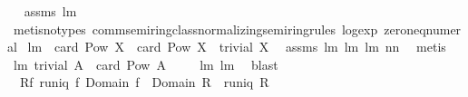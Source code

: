 \begin{isabellebody}
\isadelimproof
\ %
\endisadelimproof
%
\isatagproof
{}\isamarkupfalse%
\ assms\ lm{}{}{}\ \isanewline
{}\isamarkupfalse%
\ {\isacharparenleft}metis{\isacharparenleft}no{\isacharunderscore}types{\isacharparenright}\ comm{\isacharunderscore}semiring{\isacharunderscore}{}{\isacharunderscore}class{\isachardot}normalizing{\isacharunderscore}semiring{\isacharunderscore}rules{\isacharparenleft}{}{}{\isacharparenright}\ log{\isacharunderscore}exp\ zero{\isacharunderscore}neq{\isacharunderscore}numeral{\isacharparenright}%
\endisatagproof
{\isafoldproof}%
%
\isadelimproof
%
\endisadelimproof
\isanewline
\isanewline
{}\isamarkupfalse%
\ lm{}{}{}{\isacharcolon}\ \ {\isachardoublequoteopen}card\ {\isacharparenleft}Pow\ X{\isacharparenright}{\isacharequal}{}\ {\isasymor}\ card\ {\isacharparenleft}Pow\ X{\isacharparenright}{\isacharequal}{}{\isachardoublequoteclose}\ \ {\isachardoublequoteopen}trivial\ X{\isachardoublequoteclose}\ \isanewline
%
\isadelimproof
%
\endisadelimproof
%
\isatagproof
{}\isamarkupfalse%
\ assms\ lm{}{}{}\ lm{}{}{}\ lm{}{}{}\ nn{}{}\ \isamarkupfalse%
\ metis%
\endisatagproof
{\isafoldproof}%
%
\isadelimproof
\isanewline
%
\endisadelimproof
\isanewline
{}\isamarkupfalse%
\ lm{}{}{}{\isacharcolon}\ {\isachardoublequoteopen}trivial\ A\ {\isacharequal}\ {\isacharparenleft}card\ {\isacharparenleft}Pow\ A{\isacharparenright}\ {\isasymin}\ {\isacharbraceleft}{}{\isacharcomma}{}{\isacharbraceright}{\isacharparenright}{\isachardoublequoteclose}%
\isadelimproof
\ %
\endisadelimproof
%
\isatagproof
{}\isamarkupfalse%
\ lm{}{}{}\ lm{}{}{}\ \isamarkupfalse%
\ blast%
\endisatagproof
{\isafoldproof}%
%
\isadelimproof
%
\endisadelimproof
\isanewline
\isanewline
{}\isamarkupfalse%
\ \ {\isachardoublequoteopen}R{\isasymsubseteq}f{\isachardoublequoteclose}\ {\isachardoublequoteopen}runiq\ f{\isachardoublequoteclose}\ {\isachardoublequoteopen}Domain\ f\ {\isacharequal}\ Domain\ R{\isachardoublequoteclose}\ \ {\isachardoublequoteopen}runiq\ R{\isachardoublequoteclose}\isanewline

\end{isabellebody}
